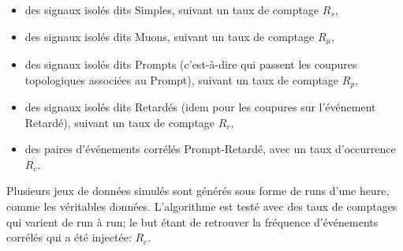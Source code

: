 \begin{itemize}
    \item des signaux isolés dits Simples, suivant un taux de comptage $R_s$,
    \item des signaux isolés dits Muons, suivant un taux de comptage $R_\mu$,
    \item des signaux isolés dits Prompts (c'est-à-dire qui passent les coupures topologiques associées au Prompt), suivant un taux de comptage $R_p$,
    \item des signaux isolés dits Retardés (idem pour les coupures sur l'événement Retardé), suivant un taux de comptage $R_r$,
    \item des paires d'événements corrélés Prompt-Retardé, avec un taux d'occurrence $R_c$.
\end{itemize}

\bigbreak

Plusieurs jeux de données simulés sont générés sous forme de runs d'une heure, comme les véritables données. L'algorithme est testé avec des taux de comptages qui varient de run à run; le but étant de retrouver la fréquence d'événements corrélés qui a été injectée: $R_c$.\\

